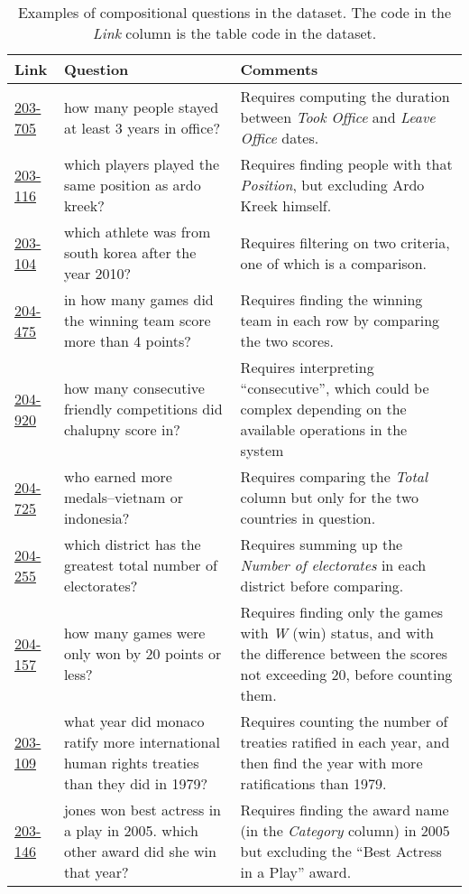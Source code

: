 \newcommand{\viewerLink}[1]{{\color{blue!50!black}\href{https://ppasupat.github.io/WikiTableQuestions/viewer/\##1}{#1}}}
\begin{table}[t]
\centering
\begin{tabular}{lp{5.3cm}p{7cm}} \toprule
\textbf{Link} & \textbf{Question} & \textbf{Comments} \\
\midrule
\viewerLink{203-705}
& how many people stayed at least 3 years in office?
& Requires computing the duration between
\emph{Took Office} and \emph{Leave Office} dates. \\
\viewerLink{203-116}
& which players played the same position as ardo kreek?
& Requires finding people with that \emph{Position},
but excluding Ardo Kreek himself. \\ 
\viewerLink{203-104}
& which athlete was from south korea after the year 2010?
& Requires filtering on two criteria,
one of which is a comparison. \\
\viewerLink{204-475}
& in how many games did the winning team score more than 4 points?
& Requires finding the winning team in each row
by comparing the two scores. \\
\viewerLink{204-920}
& how many consecutive friendly competitions did chalupny score in?
& Requires interpreting ``consecutive'',
which could be complex depending on the available operations
in the system \\
\viewerLink{204-725}
& who earned more medals--vietnam or indonesia?
& Requires comparing the \emph{Total} column
but only for the two countries in question. \\
\viewerLink{204-255}
& which district has the greatest total number of electorates?
& Requires summing up the \emph{Number of electorates}
in each district before comparing. \\
\viewerLink{204-157}
& how many games were only won by 20 points or less?
& Requires finding only the games with \emph{W} (win)
status, and with the difference between the scores
not exceeding 20, before counting them. \\
\viewerLink{203-109}
& what year did monaco ratify more international human rights treaties than they did in 1979?
& Requires counting the number of treaties ratified in each year,
and then find the year with more ratifications than 1979. \\
\viewerLink{203-146}
& jones won best actress in a play in 2005. which other award did she win that year?
& Requires finding the award name
(in the \emph{Category} column)
in 2005 but excluding
the ``Best Actress in a Play'' award. \\
\bottomrule
\end{tabular}
\caption[
Examples of compositional questions in the \wtq dataset.]{
Examples of compositional questions in the \wtq dataset.
The code in the \emph{Link} column is the table code
in the dataset.
}
\label{tab:wtq-compositional-examples}
\end{table}

